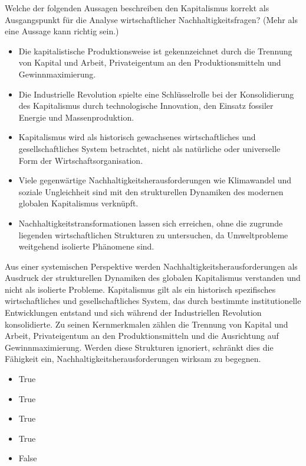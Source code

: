 \documentclass[
  nswissgerman,
  a4paper,
  DIV=11,
  numbers=noendperiod,
  oneside,
  openany]{scrreprt}
\providecommand{\tightlist}{%
  \setlength{\itemsep}{0pt}\setlength{\parskip}{0pt}}
\begin{document}
Welche der folgenden Aussagen beschreiben den Kapitalismus korrekt als
Ausgangspunkt für die Analyse wirtschaftlicher Nachhaltigkeitsfragen?
(Mehr als eine Aussage kann richtig sein.)

\begin{itemize}
\tightlist
\item[$\square$]
  Die kapitalistische Produktionsweise ist gekennzeichnet durch die
  Trennung von Kapital und Arbeit, Privateigentum an den
  Produktionsmitteln und Gewinnmaximierung.
\item[$\square$]
  Die Industrielle Revolution spielte eine Schlüsselrolle bei der
  Konsolidierung des Kapitalismus durch technologische Innovation, den
  Einsatz fossiler Energie und Massenproduktion.
\item[$\square$]
  Kapitalismus wird als historisch gewachsenes wirtschaftliches und
  gesellschaftliches System betrachtet, nicht als natürliche oder
  universelle Form der Wirtschaftsorganisation.
\item[$\square$]
  Viele gegenwärtige Nachhaltigkeitsherausforderungen wie Klimawandel
  und soziale Ungleichheit sind mit den strukturellen Dynamiken des
  modernen globalen Kapitalismus verknüpft.
\item[$\square$]
  Nachhaltigkeitstransformationen lassen sich erreichen, ohne die
  zugrunde liegenden wirtschaftlichen Strukturen zu untersuchen, da
  Umweltprobleme weitgehend isolierte Phänomene sind.
\end{itemize}

Aus einer systemischen Perspektive werden
Nachhaltigkeitsherausforderungen als Ausdruck der strukturellen
Dynamiken des globalen Kapitalismus verstanden und nicht als isolierte
Probleme. Kapitalismus gilt als ein historisch spezifisches
wirtschaftliches und gesellschaftliches System, das durch bestimmte
institutionelle Entwicklungen entstand und sich während der
Industriellen Revolution konsolidierte. Zu seinen Kernmerkmalen zählen
die Trennung von Kapital und Arbeit, Privateigentum an den
Produktionsmitteln und die Ausrichtung auf Gewinnmaximierung. Werden
diese Strukturen ignoriert, schränkt dies die Fähigkeit ein,
Nachhaltigkeitsherausforderungen wirksam zu begegnen.

\begin{itemize}
\tightlist
\item
  True
\item
  True
\item
  True
\item
  True
\item
  False
\end{itemize}
\end{document}
